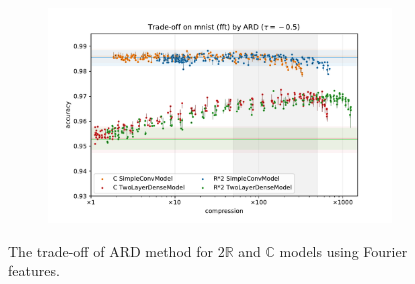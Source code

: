 \documentclass[a4paper,10pt]{article}
\newcommand{\real}{\mathbb{R}}
\newcommand{\cplx}{\mathbb{C}}
\begin{document}
\begin{figure}[b]
\begin{subfigure}[b]{0.5\textwidth}
  \end{subfigure}%
  \begin{subfigure}[b]{0.5\textwidth}
    \centering
    \includegraphics[width=\linewidth]{figure__mnist-like__trade-off/appendix__cmp__ARD__mnist__fft__-0.5.pdf}
  \end{subfigure}
  \caption{%
    The trade-off of ARD method for $2\real$ and $\cplx$ models using Fourier features.
  }
  \label{fig:appendix__cmp__mnist-like__trade-off__ARD__fft}
\end{figure}
\end{document}

